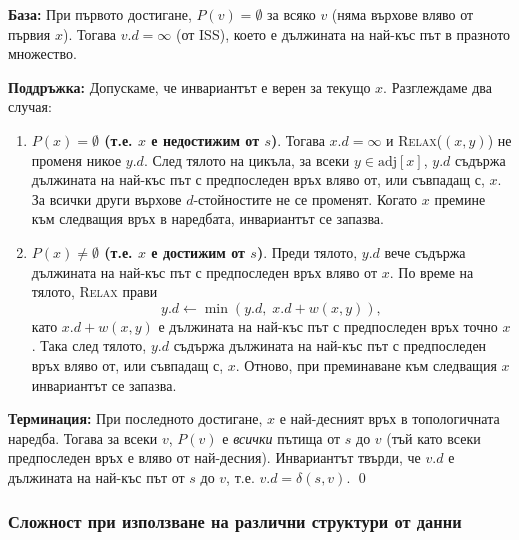 \documentclass{article}
\renewcommand{\\}{\newline}
\begin{document}
\begin{center}
\end{center}

\noindent \textbf{База:} При първото достигане, \(P(v) = \emptyset\) за всяко \(v\) (няма върхове вляво от първия \(x\)). Тогава \(v.d = \infty\) (от ISS), което е дължината на най-къс път в празното множество.

\noindent \textbf{Поддръжка:} Допускаме, че инвариантът е верен за текущо \(x\). Разглеждаме два случая:

\begin{enumerate}
\item \textbf{\(P(x) = \emptyset\) (т.е. \(x\) е недостижим от \(s\))}. Тогава \(x.d = \infty\) и \textsc{Relax}(\((x,y)\)) не променя никое \(y.d\). След тялото на цикъла, за всеки \(y \in \text{adj}[x]\), \(y.d\) съдържа дължината на най-къс път с предпоследен връх вляво от, или съвпадащ с, \(x\). За всички други върхове \(d\)-стойностите не се променят. Когато \(x\) премине към следващия връх в наредбата, инвариантът се запазва.

\item \textbf{\(P(x) \ne \emptyset\) (т.е. \(x\) е достижим от \(s\))}. Преди тялото, \(y.d\) вече съдържа дължината на най-къс път с предпоследен връх вляво от \(x\). По време на тялото, \textsc{Relax} прави
\[
y.d \gets \min(y.d,\; x.d + w(x,y)),
\]
като \(x.d + w(x,y)\) е дължината на най-къс път с предпоследен връх точно \(x\). Така след тялото, \(y.d\) съдържа дължината на най-къс път с предпоследен връх вляво от, или съвпадащ с, \(x\). Отново, при преминаване към следващия \(x\) инвариантът се запазва.
\end{enumerate}

\noindent \textbf{Терминация:} При последното достигане, \(x\) е най-десният връх в топологичната наредба. Тогава за всеки \(v\), \(P(v)\) е \emph{всички} пътища от \(s\) до \(v\) (тъй като всеки предпоследен връх е вляво от най-десния). Инвариантът твърди, че \(v.d\) е дължината на най-къс път от \(s\) до \(v\), т.е. \(v.d = \delta(s, v)\). \qed

\subsubsection{Сложност при използване на различни структури от данни}
\end{document}
